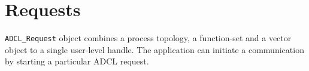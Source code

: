 \section{Requests}

{\tt ADCL\_Request} object  combines a process topology, a function-set and a vector object to a single user-level handle. The application can initiate a communication by starting a particular ADCL request.